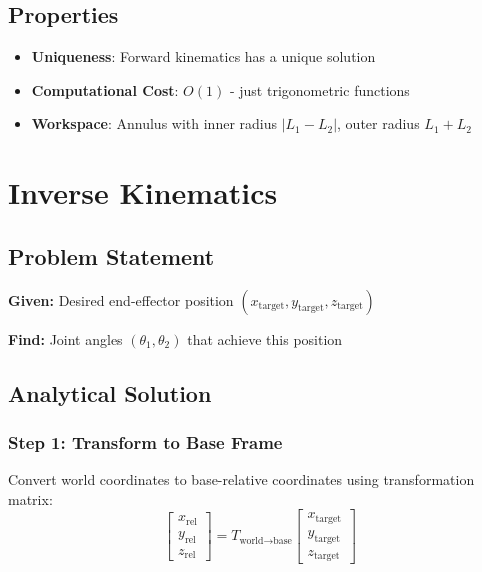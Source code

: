 \documentclass[11pt,a4paper]{article}
\begin{document}
\subsection{Properties}

\begin{itemize}
    \item \textbf{Uniqueness}: Forward kinematics has a unique solution
    \item \textbf{Computational Cost}: $O(1)$ - just trigonometric functions
    \item \textbf{Workspace}: Annulus with inner radius $|L_1-L_2|$, outer radius $L_1+L_2$
\end{itemize}

\section{Inverse Kinematics}

\subsection{Problem Statement}

\textbf{Given:} Desired end-effector position $(x_{\text{target}}, y_{\text{target}}, z_{\text{target}})$

\textbf{Find:} Joint angles $(\theta_1, \theta_2)$ that achieve this position

\subsection{Analytical Solution}

\subsubsection{Step 1: Transform to Base Frame}

Convert world coordinates to base-relative coordinates using transformation matrix:
\begin{equation}
\begin{bmatrix} x_{\text{rel}} \\ y_{\text{rel}} \\ z_{\text{rel}} \end{bmatrix} = T_{\text{world}\to\text{base}} \begin{bmatrix} x_{\text{target}} \\ y_{\text{target}} \\ z_{\text{target}} \end{bmatrix}
\end{equation}
\end{document}
